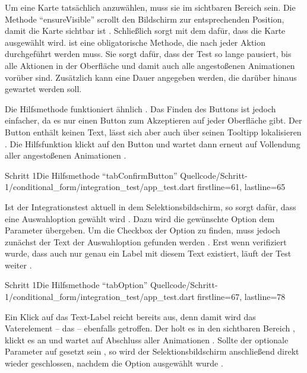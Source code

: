 Um eine Karte tatsächlich anzuwählen, muss sie im sichtbaren Bereich sein.
Die Methode \enquote{ensureVisible} scrollt den Bildschirm zur entsprechenden Position, damit die Karte sichtbar ist .
Schließlich sorgt  mit dem   dafür,
dass die Karte ausgewählt wird.   ist eine obligatorische Methode,
die nach jeder Aktion durchgeführt werden muss. Sie sorgt dafür,
dass der Test so lange pausiert,
bis alle Aktionen in der Oberfläche und damit auch alle angestoßenen Animationen vorüber sind. Zusätzlich kann eine Dauer angegeben werden, die darüber hinaus gewartet werden soll. 

Die Hilfsmethode  funktioniert ähnlich \Lst{\ref{lst:Schritt1HilfsmethodeTabConfirmButton}}.
Das Finden des Buttons ist jedoch einfacher, da es nur einen Button zum Akzeptieren auf jeder Oberfläche gibt.
Der Button enthält keinen Text, lässt sich aber auch über seinen Tooltipp lokalisieren .
Die Hilfsfunktion klickt auf den Button  und wartet dann erneut auf Vollendung aller angestoßenen Animationen .

\begin{alexlisting}{Schritt 1}{Die Hilfsmethode \enquote{tabConfirmButton}}
  {Quellcode/Schritt-1/conditional_form/integration_test/app_test.dart}
  {firstline=61, lastline=65}
  \label{lst:Schritt1HilfsmethodeTabConfirmButton}
\end{alexlisting}

Ist der Integrationstest aktuell in dem Selektionsbildschirm, so sorgt  dafür, dass eine Auswahloption gewählt wird \Lst{\ref{lst:Schritt1HilfsmethodeTabOption}}.
Dazu wird die gewünschte Option dem Parameter  übergeben.
Um die Checkbox der Option zu finden, muss jedoch zunächst der Text der Auswahloption gefunden werden .
Erst wenn verifiziert wurde, dass auch nur genau ein Label mit diesem Text existiert, läuft der Test weiter . 

\begin{alexlisting}{Schritt 1}{Die Hilfsmethode \enquote{tabOption}}
  {Quellcode/Schritt-1/conditional_form/integration_test/app_test.dart}
  {firstline=67, lastline=78}
  \label{lst:Schritt1HilfsmethodeTabOption}
\end{alexlisting}

Ein Klick auf das Text-Label reicht bereits aus,
denn damit wird das Vaterelement -- das  -- ebenfalls getroffen.
Der  holt es in den sichtbaren Bereich , klickt es an  und wartet auf Abschluss aller Animationen .
Sollte der optionale Parameter  auf  gesetzt sein , so wird der Selektionsbildschirm anschließend direkt wieder geschlossen, nachdem die Option ausgewählt wurde  . 
  
